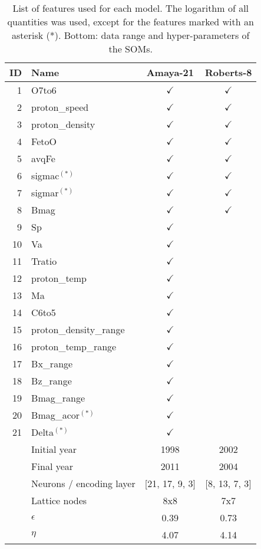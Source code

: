 \documentclass[utf8]{frontiersSCNS} %
\begin{document}
\begin{table}\centering
	\begin{tabular}{@{}rlcc@{}}
		\toprule
		ID & Name  & Amaya-21 & Roberts-8 \\
		\midrule
		1 & O7to6 & $\checkmark$ & $\checkmark$ \\
		2 & proton\_speed & $\checkmark$ & $\checkmark$ \\
		3 & proton\_density & $\checkmark$ & $\checkmark$ \\
		4 & FetoO & $\checkmark$ & $\checkmark$ \\
		5 & avqFe & $\checkmark$ & $\checkmark$ \\
		6 & sigmac$^{(*)}$ & $\checkmark$ & $\checkmark$ \\
		7 & sigmar$^{(*)}$ & $\checkmark$ & $\checkmark$ \\
		8 & Bmag & $\checkmark$ & $\checkmark$ \\
		9 & Sp & $\checkmark$ & \\
		10 & Va & $\checkmark$ & \\
		11 & Tratio & $\checkmark$ & \\
		12 & proton\_temp & $\checkmark$ & \\
		13 & Ma & $\checkmark$ & \\
		14 & C6to5 & $\checkmark$ & \\
		15 & proton\_density\_range & $\checkmark$ & \\
		16 & proton\_temp\_range & $\checkmark$ & \\
		17 & Bx\_range & $\checkmark$ & \\
		18 & Bz\_range & $\checkmark$ & \\
		19 & Bmag\_range & $\checkmark$ & \\
		20 & Bmag\_acor$^{(*)}$ & $\checkmark$ & \\
		21 & Delta$^{(*)}$ & $\checkmark$ & \\
		\midrule
		 & Initial year & 1998 & 2002 \\
		 & Final year & 2011 & 2004 \\
		 & Neurons / encoding layer & [21, 17, 9, 3] & [8, 13, 7, 3] \\
		 & Lattice nodes &  8x8 &  7x7 \\
		 & $\epsilon$ &  0.39 & 0.73 \\
		 & $\eta$ & 4.07 & 4.14 \\
		\bottomrule
	\end{tabular}
	\caption{List of features used for each model. The logarithm of all quantities was used, except for the features marked with an asterisk (*). Bottom: data range and hyper-parameters of the SOMs.}
	\label{tab:features}
\end{table}
\end{document}
